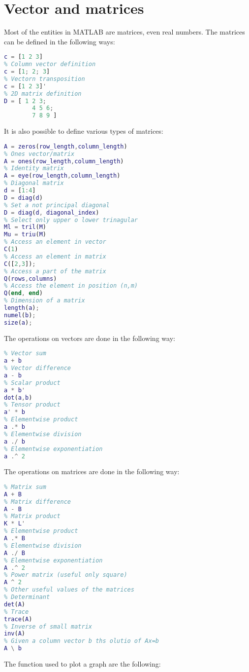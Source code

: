 \documentclass[12pt, a4paper]{report}
\begin{document}
    \section{Vector and matrices}
    Most of the entities in MATLAB are matrices, even real numbers. The matrices can be defined in the following ways: 
    \begin{lstlisting}[language=Matlab]
% Row vector definition
c = [1 2 3]
% Column vector definition
c = [1; 2; 3]
% Vectorn transposition
c = [1 2 3]'
% 2D matrix definition
D = [ 1 2 3; 
        4 5 6; 
        7 8 9 ]
    \end{lstlisting}
    It is also possible to define various types of matrices: 
    \begin{lstlisting}[language=Matlab]
% Zeros vector/matrix
A = zeros(row_length,column_length)	
% Ones vector/matrix
A = ones(row_length,column_length)	
% Identity matrix
A = eye(row_length,column_length)   
% Diagonal matrix
d = [1:4]
D = diag(d)
% Set a not principal diagonal 
D = diag(d, diagonal_index)
% Select only upper o lower trinagular
Ml = tril(M)
Mu = triu(M)
% Access an element in vector
C(1)
% Access an element in matrix
C([2,3]);
% Access a part of the matrix
Q(rows,columns)    
% Access the element in position (n,m)
Q(end, end)   
% Dimension of a matrix
length(a);
numel(b);
size(a);
    \end{lstlisting}  
    The operations on vectors are done in the following way: 
    \begin{lstlisting}[language=Matlab]
% Given two row vectors a and b
% Vector sum
a + b    
% Vector difference
a - b   
% Scalar product
a * b'      
dot(a,b)   
% Tensor product
a' * b      
% Elementwise product
a .* b  
% Elementwise division    
a ./ b  
% Elementwise exponentiation    
a .^ 2      
    \end{lstlisting}  
    The operations on matrices are done in the following way: 
    \begin{lstlisting}[language=Matlab]
% Givcen two matrices A and B (both 3x2)
% Matrix sum
A + B
% Matrix difference
A - B
% Matrix product
K * L'
% Elementwise product
A .* B
% Elementwise division
A ./ B      
% Elementwise exponentiation
A .^ 2      
% Power matrix (useful only square)
A ^ 2         
% Other useful values of the matrices
% Determinant
det(A)
% Trace
trace(A)  
% Inverse of small matrix      
inv(A)          
% Given a column vector b ths olutio of Ax=b
A \ b       
    \end{lstlisting}  
    The function used to plot a graph are the following: 
\end{document}
